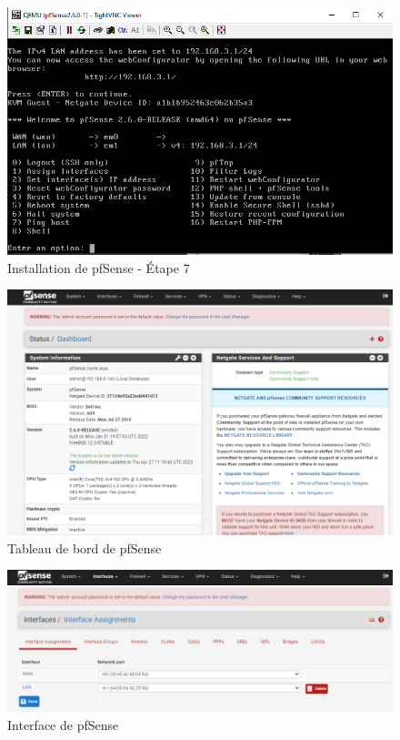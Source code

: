 \begin{figure}[H]
\centering
\includegraphics[width=15cm]{Images/BRadesMelian-Topologie8.png}
\caption{Installation de pfSense - Étape 7}
\label{Chap3.3.8}
\end{figure}

\begin{figure}[H]
\centering
\includegraphics[width=15cm]{Images/BRadesMelian-Topologie14.png}
\caption{Tableau de bord de pfSense}
\label{Chap3.3.9}
\end{figure}

\begin{figure}[H]
\centering
\includegraphics[width=15cm]{Images/BRadesMelian-Topologie15.png}
\caption{Interface de pfSense}
\label{Chap3.3.10}
\end{figure}


